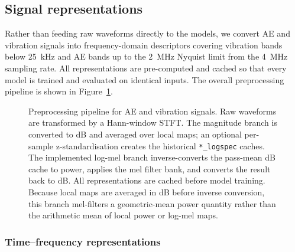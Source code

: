 \subsection{Signal representations}\label{signal-representations}

Rather than feeding raw waveforms directly to the models, we convert AE
and vibration signals into frequency-domain descriptors covering vibration
bands below 25~kHz and AE bands up to the 2~MHz Nyquist limit from the
4~MHz sampling rate. All
representations are pre-computed and cached so that every model is
trained and evaluated on identical inputs. The overall preprocessing
pipeline is shown in Figure~\ref{fig:preprocessing-pipeline}.

\begin{figure}[htbp]
\centering
\resizebox{\linewidth}{!}{}
\caption{Preprocessing pipeline for AE and vibration signals. Raw
waveforms are transformed by a Hann-window STFT. The magnitude branch is
converted to dB and averaged over local maps; an optional per-sample
z-standardisation creates the historical \texttt{*\_logspec} caches. The
implemented log-mel branch inverse-converts the pass-mean dB cache to power,
applies the mel filter bank, and converts the result back to dB. All
representations are cached before model training. Because local maps are
averaged in dB before inverse conversion, this branch mel-filters a
geometric-mean power quantity rather than the arithmetic mean of local power
or log-mel maps.}
\label{fig:preprocessing-pipeline}
\end{figure}

\subsubsection{Time--frequency representations}

